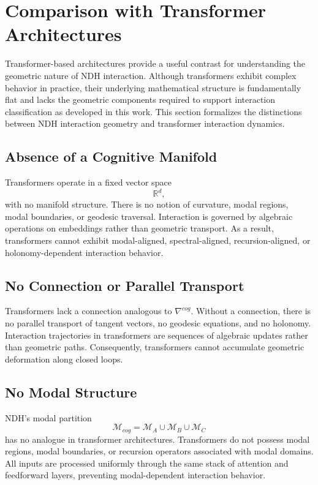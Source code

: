 \section{Comparison with Transformer Architectures}
\label{sec:transformer-comparison}

Transformer-based architectures provide a useful contrast for understanding the
geometric nature of NDH interaction. Although transformers exhibit complex
behavior in practice, their underlying mathematical structure is fundamentally
flat and lacks the geometric components required to support interaction
classification as developed in this work. This section formalizes the
distinctions between NDH interaction geometry and transformer interaction
dynamics.

\subsection{Absence of a Cognitive Manifold}

Transformers operate in a fixed vector space
\[
\mathbb{R}^d,
\]
with no manifold structure. There is no notion of curvature, modal regions,
modal boundaries, or geodesic traversal. Interaction is governed by algebraic
operations on embeddings rather than geometric transport. As a result,
transformers cannot exhibit modal-aligned, spectral-aligned, recursion-aligned,
or holonomy-dependent interaction behavior.

\subsection{No Connection or Parallel Transport}

Transformers lack a connection analogous to $\nabla^{cog}$. Without a
connection, there is no parallel transport of tangent vectors, no geodesic
equations, and no holonomy. Interaction trajectories in transformers are
sequences of algebraic updates rather than geometric paths. Consequently,
transformers cannot accumulate geometric deformation along closed loops.

\subsection{No Modal Structure}

NDH's modal partition
\[
\mathcal{M}_{cog} = \mathcal{M}_A \cup \mathcal{M}_B \cup \mathcal{M}_C
\]
has no analogue in transformer architectures. Transformers do not possess modal
regions, modal boundaries, or recursion operators associated with modal domains.
All inputs are processed uniformly through the same stack of attention and
feedforward layers, preventing modal-dependent interaction behavior.

